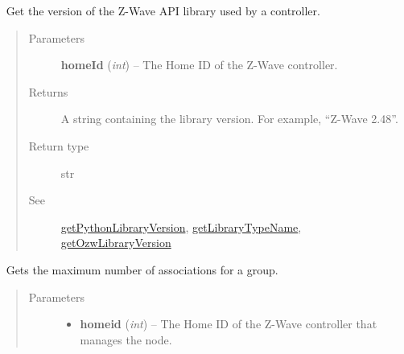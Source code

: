 \documentclass[letterpaper,10pt,english]{sphinxmanual}
\begin{document}
\begin{fulllineitems}
\begin{fulllineitems}
\begin{quote}
\begin{description}
\end{description}\end{quote}

\end{fulllineitems}


\begin{fulllineitems}
\label{libopenzwave:libopenzwave.PyManager.getLibraryVersion}~\label{libopenzwave:getlibraryversion}
Get the version of the Z-Wave API library used by a controller.
\begin{quote}\begin{description}
\item[{Parameters}] \leavevmode
\textbf{homeId} (\emph{int}) -- The Home ID of the Z-Wave controller.

\item[{Returns}] \leavevmode
A string containing the library version. For example, ``Z-Wave 2.48''.

\item[{Return type}] \leavevmode
str

\item[{See}] \leavevmode
{\hyperref[libopenzwave:getpythonlibraryversion]{getPythonLibraryVersion}}, {\hyperref[libopenzwave:getlibrarytypename]{getLibraryTypeName}}, {\hyperref[libopenzwave:getozwlibraryversion]{getOzwLibraryVersion}}

\end{description}\end{quote}

\end{fulllineitems}


\begin{fulllineitems}
\label{libopenzwave:libopenzwave.PyManager.getMaxAssociations}~\label{libopenzwave:getmaxassociations}
Gets the maximum number of associations for a group.
\begin{quote}\begin{description}
\item[{Parameters}] \leavevmode\begin{itemize}
\item {} 
\textbf{homeid} (\emph{int}) -- The Home ID of the Z-Wave controller that manages the node.


\end{itemize}
\end{description}
\end{quote}
\end{fulllineitems}
\end{fulllineitems}
\end{document}
